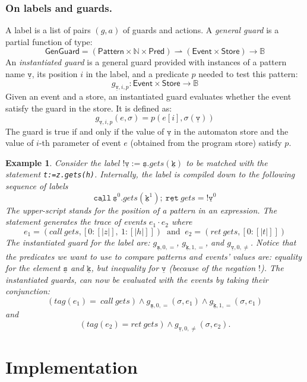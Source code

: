 \documentclass[10pt, preprint]{sigplanconf} %
\newcommand{\noterg}[2]{\textcolor{gray}{[\textcolor{red}{#1}: #2]}}
\newcommand{\rlp}[1]{\noterg{rlp}{#1}}
\newcommand{\B}{\ensuremath{\mathbb{B}}}
\newcommand{\N}{\ensuremath{\mathbb{N}}}
\newcommand{\pattern}[1]{\ensuremath{\mathtt{\underline{#1}}}}
\newcommand{\pmap}{\rightharpoonup}
\newcommand{\set}[1]{\ensuremath{\mathsf{#1}}}
\newtheorem{example}{Example}
\begin{document}
\subsubsection{On labels and guards.} %

A label is a list of pairs $(g,a)$ of guards and actions. A  {\em general guard} is a partial function of type:
\[
\set{GenGuard} = (\set{Pattern} \times \N \times \set{Pred}) \pmap (\set{Event}\times\set{Store}) \to \B
\]
An {\em instantiated guard} is a general guard provided with instances of a pattern  name $\pattern v$,  its position $i$ in the label, and a predicate $p$ needed to test this pattern:
\[
g_{\pattern{v},i,p} : \set{Event}\times\set{Store} \to \B
\]
Given an event and a store, an instantiated guard  evaluates whether the event satisfy the guard in the store. It is defined as:
\newcommand{\sem}[1]{[ \! | #1 | \! ]}
\[
g_{\pattern{v},i,p}(e, \sigma) = p(e[i],\sigma(\pattern v))
\] The guard is true if and only if the value of $\pattern{v}$ in the automaton store
and the value of $i$-th parameter of  event $e$ (obtained from the program store) satisfy $p$.
\begin{example}
Consider the label
 $ !\pattern {v} := \pattern {s}.gets(\pattern {k})$ to be matched with the statement
 {\tt t:=z.gets(h)}. Internally,  the label is compiled down to the
 following sequence of labels
\[
\pattern{call} \  \pattern{s}^0 .gets(\pattern {k}^1);  \ \pattern{ret} \ gets = ! \pattern {v}^0
\] The upper-script stands for the position of a pattern in an expression. The statement generates the trace of events $e_1 \cdot e_2$ where
\[
 e_1=(call \ gets, [0: \sem{z}, \ 1: \sem{h}])  \ \mbox{ and }  \  e_2= (ret \ gets, [0: \sem{t}])
\]
The instantiated guard for the label are:
 $g_{\pattern{s},0,=}$, $g_{\pattern{k},1,=}$, and  $g_{\pattern{v},0, \neq}$.
Notice that the predicates we want to use to compare patterns and events' values are: equality for the element $\pattern{s}$ and $\pattern{k}$,
but inequality for \pattern{v} (because of the negation $!$).
The instantiated guards, can now be evaluated with the events by taking their conjunction:
\[
 (tag(e_1)= \ call \ gets) \wedge g_{\pattern{s},0,=}(\sigma,e_1) \wedge g_{\pattern{k},1,=}(\sigma, e_1)
\] and
\[
 (tag(e_2)= ret \ gets) \wedge g_{\pattern{v},0,\neq}(\sigma,e_2).
\]
\end{example}


\section{Implementation} \label{sec:implementation} %
\end{document}
